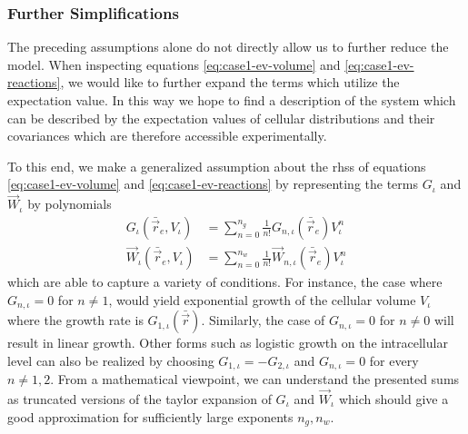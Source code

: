 \subsubsection{Further Simplifications}
The preceding assumptions alone do not directly allow us to further reduce the model.
When inspecting equations \eqref{eq:case1-ev-volume} and \eqref{eq:case1-ev-reactions}, we would
like to further expand the terms which utilize the expectation value.
In this way we hope to find a description of the system which can be described by the expectation
values of cellular distributions and their covariances which are therefore accessible
experimentally.

To this end, we make a generalized assumption about the \acp{rhs} of equations
\eqref{eq:case1-ev-volume} and \eqref{eq:case1-ev-reactions} by representing the terms $G_\iota$ and
$\vec{W}_\iota$ by polynomials
\begin{align}
    G_\iota(\bar{\vec{r}}_e,V_\iota) &=
        \sum\limits_{n=0}^{n_g}\frac{1}{n!}G_{n,\iota}(\bar{\vec{r}}_e)V_\iota^n
    \label{eq:case1-growth-taylor}\\
    \vec{W}_\iota(\bar{\vec{r}}_e,V_\iota) &=
        \sum\limits_{n=0}^{n_w}\frac{1}{n!}\vec{W}_{n,\iota}(\bar{\vec{r}}_e)V_\iota^n
    \label{eq:case1-reactions-taylor}
\end{align}
which are able to capture a variety of conditions.
For instance, the case where $G_{n,\iota}=0$ for $n\neq 1$, would yield exponential growth of the
cellular volume $V_\iota$ where the growth rate is $G_{1,\iota}(\bar{\vec{r}})$.
Similarly, the case of $G_{n,\iota}=0$ for $n\neq 0$ will result in linear growth.
Other forms such as logistic growth on the intracellular level can also be realized by choosing
$G_{1,\iota}=-G_{2,\iota}$ and $G_{n,\iota}=0$ for every $n\neq1,2$.
From a mathematical viewpoint, we can understand the presented sums as truncated versions
of the taylor expansion of $G_\iota$ and $\vec{W}_\iota$ which should give a good approximation for
sufficiently large exponents $n_g,n_w$.

